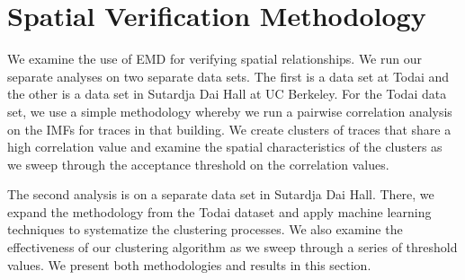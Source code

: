 \section{Spatial Verification Methodology}

We examine the use of EMD for verifying spatial relationships.  We run our separate analyses on two separate
data sets.  The first is a data set at Todai and the other is a data set in Sutardja Dai Hall at UC Berkeley.
For the Todai data set, we use a simple methodology whereby we run a pairwise correlation analysis on the IMFs
for traces in that building.  We create clusters of traces that share a high correlation value and examine
the spatial characteristics of the clusters as we sweep through the acceptance threshold on the correlation
values.  

The second analysis is on a separate data set in Sutardja Dai Hall.  There, we expand the methodology from the Todai 
dataset and apply machine learning techniques to systematize the clustering processes.  We also examine
the effectiveness of our clustering algorithm as we sweep through a series of threshold values.
We present both methodologies and results in this section.






